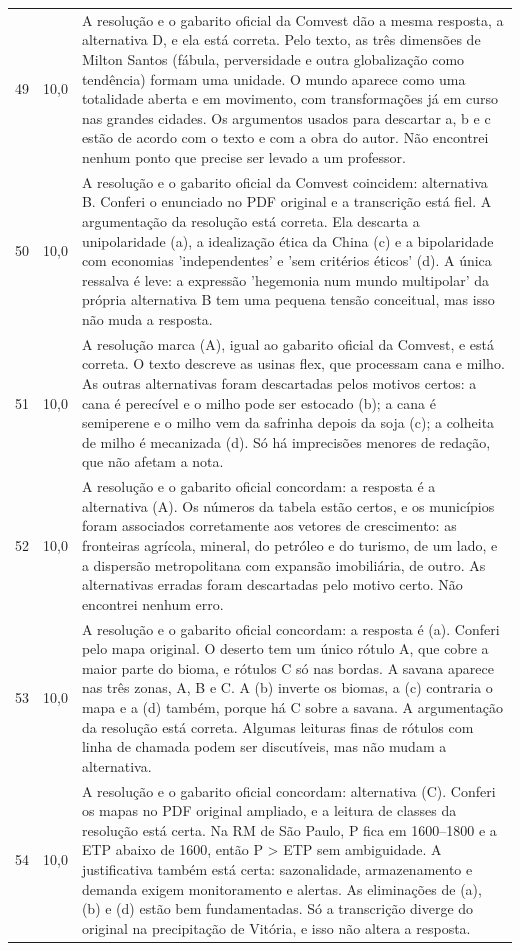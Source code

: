 \documentclass{article}%
\begin{document}
\begin{longtable}{@{}c c p{}@{}}
49 & 10,0 & A resolução e o gabarito oficial da Comvest dão a mesma resposta, a alternativa D, e ela está correta. Pelo texto, as três dimensões de Milton Santos (fábula, perversidade e outra globalização como tendência) formam uma unidade. O mundo aparece como uma totalidade aberta e em movimento, com transformações já em curso nas grandes cidades. Os argumentos usados para descartar a, b e c estão de acordo com o texto e com a obra do autor. Não encontrei nenhum ponto que precise ser levado a um professor. \\
50 & 10,0 & A resolução e o gabarito oficial da Comvest coincidem: alternativa B. Conferi o enunciado no PDF original e a transcrição está fiel. A argumentação da resolução está correta. Ela descarta a unipolaridade (a), a idealização ética da China (c) e a bipolaridade com economias 'independentes' e 'sem critérios éticos' (d). A única ressalva é leve: a expressão 'hegemonia num mundo multipolar' da própria alternativa B tem uma pequena tensão conceitual, mas isso não muda a resposta. \\
51 & 10,0 & A resolução marca (A), igual ao gabarito oficial da Comvest, e está correta. O texto descreve as usinas flex, que processam cana e milho. As outras alternativas foram descartadas pelos motivos certos: a cana é perecível e o milho pode ser estocado (b); a cana é semiperene e o milho vem da safrinha depois da soja (c); a colheita de milho é mecanizada (d). Só há imprecisões menores de redação, que não afetam a nota. \\
52 & 10,0 & A resolução e o gabarito oficial concordam: a resposta é a alternativa (A). Os números da tabela estão certos, e os municípios foram associados corretamente aos vetores de crescimento: as fronteiras agrícola, mineral, do petróleo e do turismo, de um lado, e a dispersão metropolitana com expansão imobiliária, de outro. As alternativas erradas foram descartadas pelo motivo certo. Não encontrei nenhum erro. \\
53 & 10,0 & A resolução e o gabarito oficial concordam: a resposta é (a). Conferi pelo mapa original. O deserto tem um único rótulo A, que cobre a maior parte do bioma, e rótulos C só nas bordas. A savana aparece nas três zonas, A, B e C. A (b) inverte os biomas, a (c) contraria o mapa e a (d) também, porque há C sobre a savana. A argumentação da resolução está correta. Algumas leituras finas de rótulos com linha de chamada podem ser discutíveis, mas não mudam a alternativa. \\
54 & 10,0 & A resolução e o gabarito oficial concordam: alternativa (C). Conferi os mapas no PDF original ampliado, e a leitura de classes da resolução está certa. Na RM de São Paulo, P fica em 1600--1800 e a ETP abaixo de 1600, então P > ETP sem ambiguidade. A justificativa também está certa: sazonalidade, armazenamento e demanda exigem monitoramento e alertas. As eliminações de (a), (b) e (d) estão bem fundamentadas. Só a transcrição diverge do original na precipitação de Vitória, e isso não altera a resposta. \\

\end{longtable}
\end{document}
